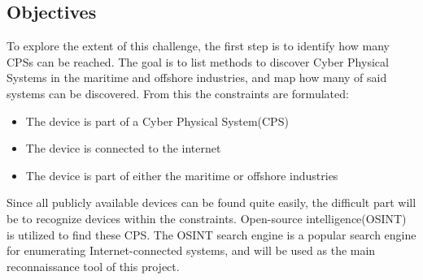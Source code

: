 \subsection{Objectives}
To explore the extent of this challenge, the first step is to identify how many CPSs can be reached. The goal is to list methods to discover Cyber Physical Systems in the maritime and offshore industries, and map how many of said systems can be discovered. From this the constraints are formulated:
\begin{itemize}
    \item The device is part of a Cyber Physical System(CPS)
    \item The device is connected to the internet
    \item The device is part of either the maritime or offshore industries
\end{itemize}
Since all publicly available devices can be found quite easily, the difficult part will be to recognize devices within the constraints.
Open-source intelligence(OSINT) is utilized to find these CPS. The OSINT search engine \href{https://shodan.io}{\color{blue}{Shodan}} is a popular search engine for enumerating Internet-connected systems, and will be used as the main reconnaissance tool of this project. 


